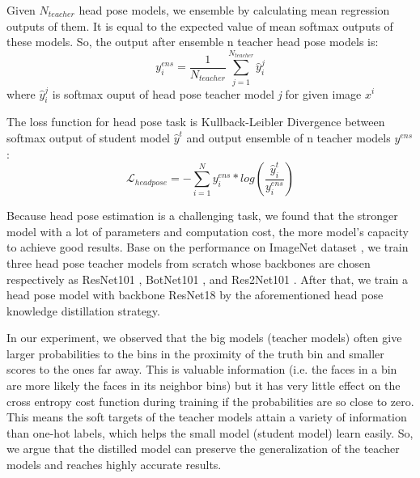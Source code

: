 \documentclass[a4paper,twoside]{article}
\begin{document}
Given \textit{$N_{teacher}$} head pose models, we ensemble by calculating mean regression outputs of them. It is equal to the expected value of mean softmax outputs of these models. So, the output after ensemble n teacher head pose models is:
\begin{equation}
    y_{i}^{ens} = \frac{1}{N_{teacher}}\sum_{j=1}^{N_{teacher}} \hat{y}^{j}_{i} 
\end{equation}
where $\hat{y}^{j}_{i}$ is softmax ouput of head pose teacher model \textit{j} for given image $x^{i}$

The loss function for head pose task is Kullback-Leibler Divergence between softmax output of student model $\hat{y}^{t}$ and output ensemble of n teacher models $y^{ens}$:
\begin{equation}
    \mathcal{L}_{headpose} = -\sum_{i=1}^{N} y^{ens}_{i}*log(\frac{\hat{y}^{t}_{i}}{y^{ens}_{i}})
\end{equation}

Because head pose estimation is a challenging task, we found that the stronger model with a lot of parameters and computation cost, the more model's capacity to achieve good results. Base on the performance on ImageNet dataset \cite{deng2009imagenet}, we train three head pose teacher models from scratch whose backbones are chosen respectively as ResNet101 \cite{he2016deep}, BotNet101 \cite{srinivas2021bottleneck}, and Res2Net101 \cite{gao2019res2net}. After that, we train a head pose model with backbone ResNet18 by the aforementioned head pose knowledge distillation strategy. 

In our experiment, we observed that the big models (teacher models) often give larger probabilities to the bins in the proximity of the truth bin and smaller scores to the ones far away. This is valuable information (i.e. the faces in a bin are more likely the faces in its neighbor bins) but it has very little effect on the cross entropy cost function during training if the probabilities are so close to zero. This means the soft targets of the teacher models attain a variety of information than one-hot labels, which helps the small model (student model) learn easily. So, we argue that the distilled model can preserve the generalization of the teacher models and reaches highly accurate results.
\end{document}
